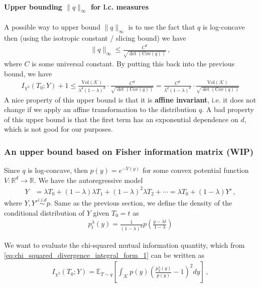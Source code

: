 \documentclass{article}
\theoremstyle{plain}
\theoremstyle{definition}
\theoremstyle{plain}
\newcommand{\R}{\mathbb R}
\newcommand{\Rd}{\mathbb{R}^d}
\newcommand{\cK}{\mathcal K}
\begin{document}
\paragraph{Upper bounding $\|q\|_\infty$ for l.c. measures}
A possible way to upper bound $\|q\|_{\infty}$ is to use the fact that $q$ is log-concave then (using the isotropic constant / slicing bound) we have
\begin{align}
    \|q\|_{\infty} \le \frac{C^d}{\sqrt{\det(\mathrm{Cov}(q))}}\,,
\end{align}
where $C$ is some universal constant.
By putting this back into the previous bound, we have
\begin{align}
    I_{\chi^2}(T_0; Y) + 1
    \le
    \frac{\mathrm{Vol}(\cK)}{\lambda^d (1-\lambda)^d} \cdot \frac{C^d}{\sqrt{\det(\mathrm{Cov}(q))}}
    =
    \frac{C^d}{\lambda^d (1-\lambda)^d} \cdot \frac{\mathrm{Vol}(\cK)}{\sqrt{\det(\mathrm{Cov}(q))}}
\end{align}
A nice property of this upper bound is that it is \textbf{affine invariant},
i.e. it does not change if we apply an affine transformation to the distribution $q$.
A bad property of this upper bound is that the first term has an exponential dependence on $d$, which is not good for our purposes.


\clearpage
\subsubsection{An upper bound based on Fisher information matrix (WIP)}
Since $q$ is log-concave, then $p(y) = e^{-V(y)}$ for some convex potential function $V:\Rd \to \R$.
We have the autoregressive model
\begin{align}
    Y & = \lambda T_0 + (1-\lambda) \lambda T_1 + (1-\lambda)^2 \lambda T_2 + \cdots = \lambda T_0 + (1-\lambda) Y'\,,
\end{align}
where $Y, Y' \stackrel{i.i.d}{\sim} p$.
Same as the previous section, we define the density of the conditional distribution of $Y$ given $T_0 = t$ as
\begin{align}
    p^\lambda_t(y) = \frac{1}{(1-\lambda)^d} p\left(\frac{y - \lambda t}{1-\lambda}\right)
\end{align}

We want to evaluate the chi-squared mutual information quantity, which from \eqref{eq:chi_squared_divergence_integral_form_1} can be written as
\begin{align}
    I_{\chi^2}(T_0; Y) = \mathbb{E}_{T \sim q} \left[ \int_{\cK} p(y) \left( \frac{p^\lambda_T(y)}{p(y)} - 1 \right)^2 dy \right]\,,
    \label{eq:chi_squared_divergence_integral_form_3}
\end{align}
\end{document}
